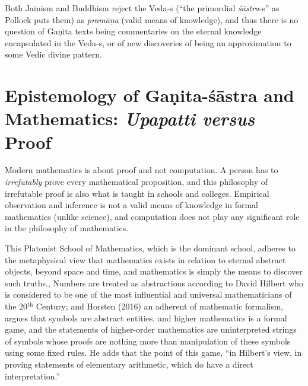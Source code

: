 Both Jainism and Buddhism reject the Veda-s (``the primordial {\sl śās\-tra}-s'' as Pollock puts them) as {\sl pramāṇa} (valid means of knowledge), and thus there is no question of Gaṇita texts being commentaries on the eternal knowledge encapsulated in the Veda-s, or of new discoveries of being an approximation to some Vedic divine pattern.

\section*{Epistemology of Gaṇita-śāstra and Mathematics: {\sl\bfseries Upapatti versus} Proof}

Modern mathematics is about proof and not computation. A person has to {\sl irrefutably} prove every mathematical proposition, and this philosophy of irrefutable proof is also what is taught in schools and colleges. Empirical observation and inference is not a valid means of knowledge in formal mathematics (unlike science), and computation does not play any significant role in the philosophy of mathematics. 

This Platonist School of Mathematics, which is the dominant school, adheres to the metaphysical view that mathematics exists in relation to eternal abstract objects, beyond space and time, and mathematics is simply the means to discover such truths., Numbers are treated as abstractions according to David Hilbert who is considered to be one of the most influential and universal mathematicians of the 20$^{\text{th}}$ Century; and Horsten (2016) an adherent of mathematic formalism, argues that symbols are abstract entities, and higher mathematics is a formal game, and the statements of higher-order mathematics are uninterpreted strings of symbols whose proofs are nothing more than manipulation of these symbols using some fixed rules. He adds that the point of this game, “in Hilbert's view, in proving statements of elementary arithmetic, which do have a direct interpretation.”

